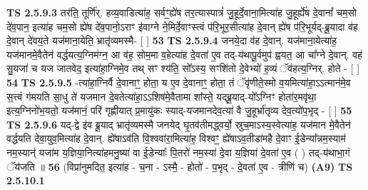 \documentclass[17pt]{extarticle}
\begin{document}
                  \newline
                                \textbf{ TS 2.5.9.3} \newline
                  तर॑ति॒ तूर्णि॑र्. हव्य॒वाडित्या॑ह॒ सर्वꣳ॒॒ह्ये॑ष तर॒त्यास्पात्रं॑ जु॒हूर्दे॒वाना॒मित्या॑ह जु॒हूर्ह्ये॑ष दे॒वानां᳚ चम॒सो दे॑व॒पान॒ इत्या॑ह चम॒सो ह्ये॑ष दे॑व॒पानो॒ऽराꣳ इ॑वाग्ने ने॒मिर्दे॒वाꣳस्त्वं प॑रि॒भूर॒सीत्या॑ह दे॒वान् ह्ये॑ष प॑रि॒भूर्यद्-ब्रू॒यादा व॑ह दे॒वान् दे॑वय॒ते यज॑माना॒येति॒ भ्रातृ॑व्यमस्मै- [  ] \textbf{  53} \newline
                  \newline
                                \textbf{ TS 2.5.9.4} \newline
                  जनये॒दा व॑ह दे॒वान्. यज॑माना॒येत्या॑ह॒ यज॑मानमे॒वैतेन॑ वर्द्धयत्य॒ग्निम॑ग्न॒ आ व॑ह॒ सोम॒मा व॒हेत्या॑ह दे॒वता॑ ए॒व तद्-य॑थापू॒र्वमुप॑ ह्वयत॒ आ चा᳚ग्ने दे॒वान्. वह॑ सु॒यजा॑ च यज जातवेद॒ इत्या॑हा॒ग्निमे॒व तथ् सꣳ श्य॑ति॒ सो᳚ऽस्य॒ सꣳशि॑तो दे॒वेभ्यो॑ ह॒व्यं ॅव॑हत्य॒ग्निर्. होते - [  ] \textbf{  54} \newline
                  \newline
                                \textbf{ TS 2.5.9.5} \newline
                  -त्या॑हा॒ग्निर्वै दे॒वानाꣳ॒॒ होता॒ य ए॒व दे॒वानाꣳ॒॒ होता॒ तं ॅवृ॑णीते॒स्मो व॒यमित्या॑हा॒ऽऽत्मान॑मे॒व स॒त्त्वं ग॑मयति सा॒धु ते॑ यजमान दे॒वतेत्या॑हा॒ऽऽशिष॑मे॒वैतामा शा᳚स्ते॒ यद्ब्रू॒याद्-यो᳚ऽग्निꣳ होता॑र॒मवृ॑था॒ इत्य॒ग्निनो॑भ॒यतो॒ यज॑मानं॒ परि॑ गृह्णीयात् प्र॒मायु॑कः स्याद्-यजमानदेव॒त्या॑ वै जु॒हूर्भ्रा॑तृव्य देव॒त्यो॑प॒भृद् - [  ] \textbf{  55} \newline
                  \newline
                                \textbf{ TS 2.5.9.6} \newline
                  यद्-द्वे इ॑व ब्रू॒याद् भ्रातृ॑व्यमस्मै जनयेद् घृ॒तव॑तीमद्ध्वर्यो॒ स्रुच॒माऽस्य॒स्वेत्या॑ह॒ यज॑मान मे॒वैतेन॑ वर्द्धयति देवा॒युव॒मित्या॑ह दे॒वान्. ह्ये॑षाऽव॑ति वि॒श्ववा॑रा॒मित्या॑ह॒ विश्वꣳ॒॒ ह्ये॑षाऽव॒तीडा॑महै दे॒वाꣳ ई॒डेन्या᳚न्नम॒स्याम॑ नम॒स्यान्॑ यजा॑म य॒ज्ञिया॒नित्या॑हमनु॒ष्या॑ वा ई॒डेन्याः᳚ पि॒तरो॑ नम॒स्या॑ दे॒वा य॒ज्ञिया॑ दे॒वता॑ ए॒व ( ) तद्-य॑थाभा॒गं ॅय॑जति ॥ \textbf{  56 } \newline
                  \newline
                      (विप्रा॑नुमदित॒ इत्या॑ह - च॒ना - ऽस्मै॒ - होतो॑ - प॒भृद् - दे॒वता॑ ए॒व - त्रीणि॑ च)  \textbf{(A9)} \newline \newline
                                        \textbf{ TS 2.5.10.1} \newline
\end{document}
